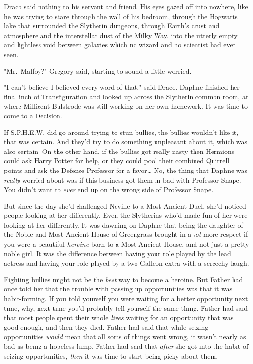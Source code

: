 Draco said nothing to his servant and friend. His eyes gazed off into nowhere, 
like he was trying to stare through the wall of his bedroom, through the 
Hogwarts lake that surrounded the Slytherin dungeons, through Earth's crust and 
atmosphere and the interstellar dust of the Milky Way, into the utterly empty 
and lightless void between galaxies which no wizard and no scientist had ever 
seen.

"Mr.~Malfoy?" Gregory said, starting to sound a little worried.

"I can't believe I believed every word of that," said Draco.
\sbreak
Daphne finished her final inch of Transfiguration and looked up across the 
Slytherin common room, at where Millicent Bulstrode was still working on her 
own homework. It was time to come to a Decision.

If S.P.H.E.W. did go around trying to stun bullies, the bullies wouldn't like 
it, that was certain. And they'd try to do something unpleasant about it, which 
was also certain. On the other hand, if the bullies got really nasty then 
Hermione could ask Harry Potter for help, or they could pool their combined 
Quirrell points and ask the Defense Professor for a favor{\ldots} No, the thing 
that Daphne was \emph{really} worried about was if this business got them in 
bad with Professor Snape. You didn't want to \emph{ever} end up on the wrong 
side of Professor Snape.

But since the day she'd challenged Neville to a Most Ancient Duel, she'd 
noticed people looking at her differently. Even the Slytherins who'd made fun 
of her were looking at her differently. It was dawning on Daphne that being the 
daughter of the Noble and Most Ancient House of Greengrass brought in a 
\emph{lot} more respect if you were a beautiful \emph{heroine} born to a Most 
Ancient House, and not just a pretty noble girl. It was the difference between 
having your role played by the lead actress and having your role played by a 
two-Galleon extra with a screechy laugh.

Fighting bullies might not be the \emph{best} way to become a heroine. But 
Father had once told her that the trouble with passing up opportunities was 
that it was habit-forming. If you told yourself you were waiting for a better 
opportunity next time, why, next time you'd probably tell yourself the same 
thing. Father had said that most people spent their whole \emph{lives} waiting 
for an opportunity that was good enough, and then they died. Father had said 
that while seizing opportunities \emph{would} mean that all sorts of things 
went wrong, it wasn't nearly as bad as being a hopeless lump. Father had said 
that \emph{after} she got into the habit of seizing opportunities, \emph{then} 
it was time to start being picky about them.

